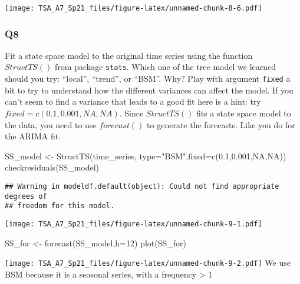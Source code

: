 \documentclass[
]{article}
\newenvironment{Shaded}{\begin{snugshade}}{\end{snugshade}}
\newcommand{\AttributeTok}[1]{\textcolor[rgb]{0.77,0.63,0.00}{#1}}
\newcommand{\ConstantTok}[1]{\textcolor[rgb]{0.00,0.00,0.00}{#1}}
\newcommand{\DecValTok}[1]{\textcolor[rgb]{0.00,0.00,0.81}{#1}}
\newcommand{\FloatTok}[1]{\textcolor[rgb]{0.00,0.00,0.81}{#1}}
\newcommand{\FunctionTok}[1]{\textcolor[rgb]{0.00,0.00,0.00}{#1}}
\newcommand{\NormalTok}[1]{#1}
\newcommand{\OtherTok}[1]{\textcolor[rgb]{0.56,0.35,0.01}{#1}}
\newcommand{\StringTok}[1]{\textcolor[rgb]{0.31,0.60,0.02}{#1}}
\begin{document}
\texttt{[image: TSA\_A7\_Sp21\_files/figure-latex/unnamed-chunk-8-6.pdf]}

\hypertarget{q8}{%
\subsubsection{Q8}\label{q8}}

Fit a state space model to the original time series using the function
\(StructTS()\) from package \texttt{stats}. Which one of the tree model
we learned should you try: ``local'', ``trend'', or ``BSM''. Why? Play
with argument \texttt{fixed} a bit to try to understand how the
different variances can affect the model. If you can't seem to find a
variance that leads to a good fit here is a hint: try
\(fixed=c(0.1, 0.001, NA, NA)\). Since \(StructTS()\) fits a state space
model to the data, you need to use \(forecast()\) to generate the
forecasts. Like you do for the ARIMA fit.

\begin{Shaded}
\begin{Highlighting}[]
\NormalTok{SS\_model }\OtherTok{\textless{}{-}} \FunctionTok{StructTS}\NormalTok{(time\_series,}
                    \AttributeTok{type=}\StringTok{"BSM"}\NormalTok{,}\AttributeTok{fixed=}\FunctionTok{c}\NormalTok{(}\FloatTok{0.1}\NormalTok{,}\FloatTok{0.001}\NormalTok{,}\ConstantTok{NA}\NormalTok{,}\ConstantTok{NA}\NormalTok{)) }
\FunctionTok{checkresiduals}\NormalTok{(SS\_model)}
\end{Highlighting}
\end{Shaded}

\begin{verbatim}
## Warning in modeldf.default(object): Could not find appropriate degrees of
## freedom for this model.
\end{verbatim}

\texttt{[image: TSA\_A7\_Sp21\_files/figure-latex/unnamed-chunk-9-1.pdf]}

\begin{Shaded}
\begin{Highlighting}[]
\NormalTok{SS\_for }\OtherTok{\textless{}{-}} \FunctionTok{forecast}\NormalTok{(SS\_model,}\AttributeTok{h=}\DecValTok{12}\NormalTok{)}
\FunctionTok{plot}\NormalTok{(SS\_for)}
\end{Highlighting}
\end{Shaded}

\texttt{[image: TSA\_A7\_Sp21\_files/figure-latex/unnamed-chunk-9-2.pdf]}
We use BSM because it is a seasonal series, with a frequency
\textgreater{} 1
\end{document}
